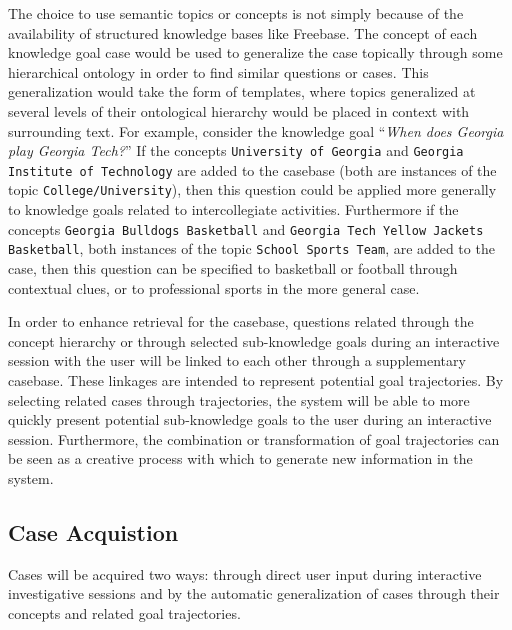 \documentclass[11pt,letterpaper]{article}
\begin{document}
The choice to use semantic topics or concepts is not simply because of the availability of structured knowledge bases like Freebase. The concept of each knowledge goal case would be used to generalize the case topically through some hierarchical ontology in order to find similar questions or cases. This generalization would take the form of templates, where topics generalized at several levels of their ontological hierarchy would be placed in context with surrounding text. For example, consider the knowledge goal ``\textit{When does Georgia play Georgia Tech?}'' If the concepts \texttt{University of Georgia} and \texttt{Georgia Institute of Technology} are added to the casebase (both are instances of the topic \texttt{College/University}), then this question could be applied more generally to knowledge goals related to intercollegiate activities. Furthermore if the concepts \texttt{Georgia Bulldogs Basketball} and \texttt{Georgia Tech Yellow Jackets Basketball}, both instances of the topic \texttt{School Sports Team}, are added to the case, then this question can be specified to basketball or football through contextual clues, or to professional sports in the more general case.

In order to enhance retrieval for the casebase, questions related through the concept hierarchy or through selected sub-knowledge goals during an interactive session with the user will be linked to each other through a supplementary casebase. These linkages are intended to represent potential goal trajectories. By selecting related cases through trajectories, the system will be able to more quickly present potential sub-knowledge goals to the user during an interactive session. Furthermore, the combination or transformation of goal trajectories can be seen as a creative process with which to generate new information in the system.

\subsection{Case Acquistion}

Cases will be acquired two ways: through direct user input during interactive investigative sessions and by the automatic generalization of cases through their concepts and related goal trajectories.
\end{document}
